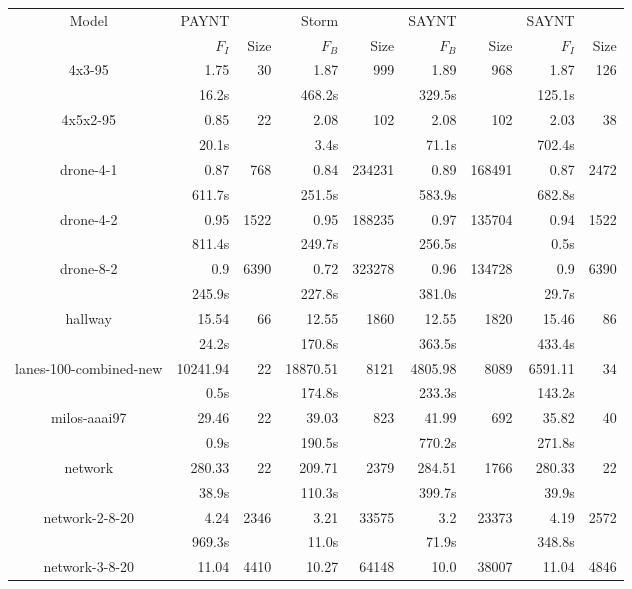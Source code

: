 \begin{table}
\begin{tabular}{|c|rr|rr|rr|rr|}
\hline

Model & PAYNT & & Storm & & SAYNT & & SAYNT & \\ 

 & $F_{I}$ & Size & $F_{B}$ & Size & $F_{B}$ & Size & $F_{I}$ & Size \\ \hline 

4x3-95 & 1.75 & 30 & 1.87 & 999 & 1.89 & 968 & 1.87 & 126 \\
 & 16.2s & & 468.2s & & 329.5s & & 125.1s & \\
\hline
4x5x2-95 & 0.85 & 22 & 2.08 & 102 & 2.08 & 102 & 2.03 & 38 \\
 & 20.1s & & 3.4s & & 71.1s & & 702.4s & \\
\hline
drone-4-1 & 0.87 & 768 & 0.84 & 234231 & 0.89 & 168491 & 0.87 & 2472 \\
 & 611.7s & & 251.5s & & 583.9s & & 682.8s & \\
\hline
drone-4-2 & 0.95 & 1522 & 0.95 & 188235 & 0.97 & 135704 & 0.94 & 1522 \\
 & 811.4s & & 249.7s & & 256.5s & & 0.5s & \\
\hline
drone-8-2 & 0.9 & 6390 & 0.72 & 323278 & 0.96 & 134728 & 0.9 & 6390 \\
 & 245.9s & & 227.8s & & 381.0s & & 29.7s & \\
\hline
hallway & 15.54 & 66 & 12.55 & 1860 & 12.55 & 1820 & 15.46 & 86 \\
 & 24.2s & & 170.8s & & 363.5s & & 433.4s & \\
\hline
lanes-100-combined-new & 10241.94 & 22 & 18870.51 & 8121 & 4805.98 & 8089 & 6591.11 & 34 \\
 & 0.5s & & 174.8s & & 233.3s & & 143.2s & \\
\hline
milos-aaai97 & 29.46 & 22 & 39.03 & 823 & 41.99 & 692 & 35.82 & 40 \\
 & 0.9s & & 190.5s & & 770.2s & & 271.8s & \\
\hline
network & 280.33 & 22 & 209.71 & 2379 & 284.51 & 1766 & 280.33 & 22 \\
 & 38.9s & & 110.3s & & 399.7s & & 39.9s & \\
\hline
network-2-8-20 & 4.24 & 2346 & 3.21 & 33575 & 3.2 & 23373 & 4.19 & 2572 \\
 & 969.3s & & 11.0s & & 71.9s & & 348.8s & \\
\hline
network-3-8-20 & 11.04 & 4410 & 10.27 & 64148 & 10.0 & 38007 & 11.04 & 4846 \\

\end{tabular}
\end{table}
